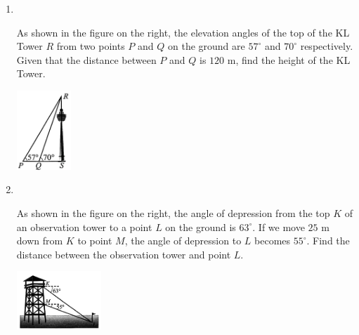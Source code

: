 \documentclass{report}
\begin{document}
    \begin{enumerate}
        \item \parbox[t]{0.9\textwidth}{
            ~
            \vspace{-1.1em}
            \begin{vwcol}[widths={0.6,0.4}, sep=8mm, rule=0pt]
                As shown in the figure on the right, the elevation angles of the top of the KL Tower $R$ from two points $P$ and $Q$ on the ground are $57^\circ$ and $70^\circ$ respectively. Given that the distance between $P$ and $Q$ is $120$ m, find the height of the KL Tower.
    
                \includegraphics[width=0.16\textwidth]{assets/10-59.jpg}
            \end{vwcol}
        }

        \vspace{3em}
        \item \parbox[t]{0.9\textwidth}{
            ~
            \vspace{-1.1em}
            \begin{vwcol}[widths={0.6,0.4}, sep=8mm, rule=0pt]
                As shown in the figure on the right, the angle of depression from the top $K$ of an observation tower to a point $L$ on the ground is $63^\circ$. If we move $25$ m down from $K$ to point $M$, the angle of depression to $L$ becomes $55^\circ$. Find the distance between the observation tower and point $L$.
    
                \includegraphics[width=0.25\textwidth]{assets/10-60.jpg}
            \end{vwcol}
        }
    \end{enumerate}
    
\end{document}
